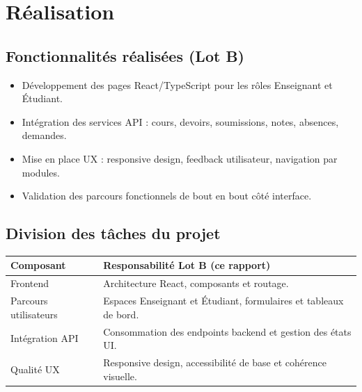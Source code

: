 \chapter{Réalisation}

\section{Fonctionnalités réalisées (Lot B)}
\begin{itemize}
  \item Développement des pages React/TypeScript pour les rôles Enseignant et Étudiant.
  \item Intégration des services API : cours, devoirs, soumissions, notes, absences, demandes.
  \item Mise en place UX : responsive design, feedback utilisateur, navigation par modules.
  \item Validation des parcours fonctionnels de bout en bout côté interface.
\end{itemize}

\section{Division des tâches du projet}
\begin{tabularx}{\textwidth}{lX}
\toprule
\textbf{Composant} & \textbf{Responsabilité Lot B (ce rapport)} \\
\midrule
Frontend & Architecture React, composants et routage.
\\
Parcours utilisateurs & Espaces Enseignant et Étudiant, formulaires et tableaux de bord.
\\
Intégration API & Consommation des endpoints backend et gestion des états UI.
\\
Qualité UX & Responsive design, accessibilité de base et cohérence visuelle.
\\
\bottomrule
\end{tabularx}
